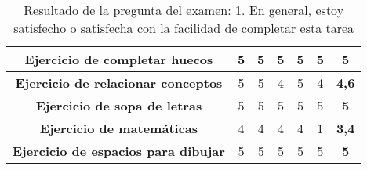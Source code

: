 \begin{table}[H]
{\begin{tabular}{c|cccccc|}
            \multicolumn{1}{|c|}{\textbf{Ejercicio de completar huecos}}       & \multicolumn{1}{c|}{5}                                                                                              & \multicolumn{1}{c|}{5}                  & \multicolumn{1}{c|}{5}                  & \multicolumn{1}{c|}{5}                  & \multicolumn{1}{c|}{5}                  & \textbf{5}     \\ \hline
            \multicolumn{1}{|c|}{\textbf{Ejercicio de relacionar conceptos}}   & \multicolumn{1}{c|}{5}                                                                                              & \multicolumn{1}{c|}{5}                  & \multicolumn{1}{c|}{4}                  & \multicolumn{1}{c|}{5}                  & \multicolumn{1}{c|}{4}                  & \textbf{4,6}   \\ \hline
            \multicolumn{1}{|c|}{\textbf{Ejercicio de sopa de letras}}         & \multicolumn{1}{c|}{5}                                                                                              & \multicolumn{1}{c|}{5}                  & \multicolumn{1}{c|}{5}                  & \multicolumn{1}{c|}{5}                  & \multicolumn{1}{c|}{5}                  & \textbf{5}     \\ \hline
            \multicolumn{1}{|c|}{\textbf{Ejercicio de matemáticas}}            & \multicolumn{1}{c|}{4}                                                                                              & \multicolumn{1}{c|}{4}                  & \multicolumn{1}{c|}{4}                  & \multicolumn{1}{c|}{4}                  & \multicolumn{1}{c|}{1}                  & \textbf{3,4}   \\ \hline
            \multicolumn{1}{|c|}{\textbf{Ejercicio de espacios para dibujar}}  & \multicolumn{1}{c|}{5}                                                                                              & \multicolumn{1}{c|}{5}                  & \multicolumn{1}{c|}{5}                  & \multicolumn{1}{c|}{5}                  & \multicolumn{1}{c|}{5}                  & \textbf{5}     \\ \hline
        \end{tabular}%
    }
    \caption{Resultado de la pregunta del examen: 1. En general, estoy satisfecho o satisfecha con la facilidad de completar esta tarea}
    \label{tab:Pregunta1}
\end{table}


